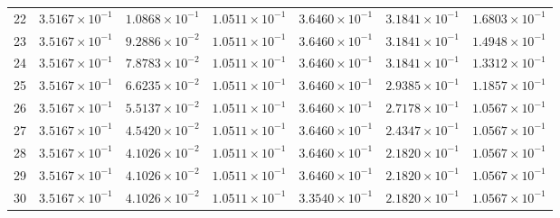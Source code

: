 \begin{table}[H]
\begin{tabular}{@{}rrrrrrr@{}}
22 & $3.5167\times10^{-1}$ & $1.0868\times10^{-1}$ & $1.0511\times10^{-1}$ & $3.6460\times10^{-1}$ & $3.1841\times10^{-1}$ & $1.6803\times10^{-1}$\\
23 & $3.5167\times10^{-1}$ & $9.2886\times10^{-2}$ & $1.0511\times10^{-1}$ & $3.6460\times10^{-1}$ & $3.1841\times10^{-1}$ & $1.4948\times10^{-1}$\\
24 & $3.5167\times10^{-1}$ & $7.8783\times10^{-2}$ & $1.0511\times10^{-1}$ & $3.6460\times10^{-1}$ & $3.1841\times10^{-1}$ & $1.3312\times10^{-1}$\\
25 & $3.5167\times10^{-1}$ & $6.6235\times10^{-2}$ & $1.0511\times10^{-1}$ & $3.6460\times10^{-1}$ & $2.9385\times10^{-1}$ & $1.1857\times10^{-1}$\\
26 & $3.5167\times10^{-1}$ & $5.5137\times10^{-2}$ & $1.0511\times10^{-1}$ & $3.6460\times10^{-1}$ & $2.7178\times10^{-1}$ & $1.0567\times10^{-1}$\\
27 & $3.5167\times10^{-1}$ & $4.5420\times10^{-2}$ & $1.0511\times10^{-1}$ & $3.6460\times10^{-1}$ & $2.4347\times10^{-1}$ & $1.0567\times10^{-1}$\\
28 & $3.5167\times10^{-1}$ & $4.1026\times10^{-2}$ & $1.0511\times10^{-1}$ & $3.6460\times10^{-1}$ & $2.1820\times10^{-1}$ & $1.0567\times10^{-1}$\\
29 & $3.5167\times10^{-1}$ & $4.1026\times10^{-2}$ & $1.0511\times10^{-1}$ & $3.6460\times10^{-1}$ & $2.1820\times10^{-1}$ & $1.0567\times10^{-1}$\\
30 & $3.5167\times10^{-1}$ & $4.1026\times10^{-2}$ & $1.0511\times10^{-1}$ & $3.3540\times10^{-1}$ & $2.1820\times10^{-1}$ & $1.0567\times10^{-1}$\\
\bottomrule
\end{tabular}
\end{table}

